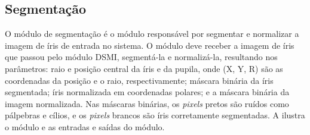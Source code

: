
\subsection{Segmentação}\label{sec:metodologia:segmentacao}

\par O módulo de segmentação é o módulo responsável por segmentar e normalizar a imagem de íris de entrada no sistema. O módulo deve receber a imagem de íris que passou pelo módulo \acrshort{DSMI}, segmentá-la e normalizá-la, resultando nos parâmetros: raio e posição central da íris e da pupila, onde (X, Y, R) são as coordenadas da posição e o raio, respectivamente; máscara binária da íris segmentada; íris normalizada em coordenadas polares; e a máscara binária da imagem normalizada. Nas máscaras binárias, os \textit{pixels} pretos são ruídos como pálpebras e cílios, e os \textit{pixels} brancos são íris corretamente segmentadas. A  ilustra o módulo e as entradas e saídas do módulo.


